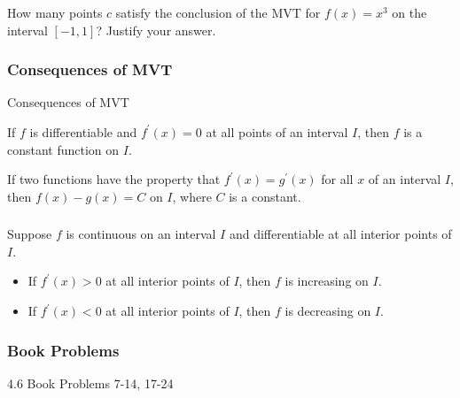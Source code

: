 \documentclass[cal1spr16Lectures.tex]{subfiles}
\begin{document}
\begin{frame}%
\frametitle{}
\begin{ex} How many points $c$ satisfy the conclusion of the MVT for $f(x)=x^3$ on the interval $[-1,1]$?  Justify your answer. \end{ex}
\end{frame}

\subsubsection{Consequences of MVT}

\begin{frame}{\small Consequences of MVT}
\small
\begin{thm}
If $f$ is differentiable and $f^{\prime}(x)=0$ at all points of an interval $I$, then $f$ is a constant function on $I$.
\end{thm}

\vspace{1pc}
\begin{thm}
If two functions have the property that $f^{\prime}(x)=g^{\prime}(x)$ for all $x$ of an interval $I$, then $f(x)-g(x)=C$ on $I$, where $C$ is a constant.
\end{thm}
\end{frame}

\begin{frame}
\frametitle{}
\small
\begin{thm}
Suppose $f$ is continuous on an interval $I$ and differentiable at all interior points of $I$.
\begin{itemize}
\item If $f^{\prime}(x)>0$ at all interior points of $I$, then $f$ is increasing on $I$.
\item If $f^{\prime}(x)<0$ at all interior points of $I$, then $f$ is decreasing on $I$.
\end{itemize}
\end{thm}
\end{frame}

\subsubsection{Book Problems}

\begin{frame}
\begin{block}{4.6 Book Problems}
7-14, 17-24
\end{block}
\end{frame}
\end{document}
